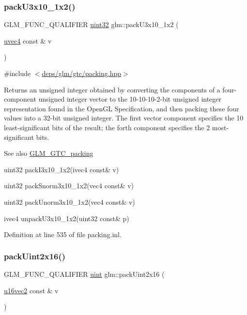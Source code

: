 \subsubsection{\texorpdfstring{pack\+U3x10\+\_\+1x2()}{packU3x10\_1x2()}}
{\footnotesize\ttfamily G\+L\+M\+\_\+\+F\+U\+N\+C\+\_\+\+Q\+U\+A\+L\+I\+F\+I\+ER \hyperlink{group__gtc__type__precision_ga202b6a53c105fcb7e531f9b443518451}{uint32} glm\+::pack\+U3x10\+\_\+1x2 (\begin{DoxyParamCaption}\item[{\hyperlink{group__core__types_ga1c426d19627b32b14f0089f7f4ba7b1d}{uvec4} const \&}]{v }\end{DoxyParamCaption})}



{\ttfamily \#include $<$\hyperlink{gtc_2packing_8hpp}{deps/glm/gtc/packing.\+hpp}$>$}

Returns an unsigned integer obtained by converting the components of a four-\/component unsigned integer vector to the 10-\/10-\/10-\/2-\/bit unsigned integer representation found in the Open\+GL Specification, and then packing these four values into a 32-\/bit unsigned integer. The first vector component specifies the 10 least-\/significant bits of the result; the forth component specifies the 2 most-\/significant bits.

\begin{DoxySeeAlso}{See also}
\hyperlink{group__gtc__packing}{G\+L\+M\+\_\+\+G\+T\+C\+\_\+packing} 

uint32 pack\+I3x10\+\_\+1x2(ivec4 const\& v) 

uint32 pack\+Snorm3x10\+\_\+1x2(vec4 const\& v) 

uint32 pack\+Unorm3x10\+\_\+1x2(vec4 const\& v) 

ivec4 unpack\+U3x10\+\_\+1x2(uint32 const\& p) 
\end{DoxySeeAlso}


Definition at line 535 of file packing.\+inl.

\mbox{\label{group__gtc__packing_gad5ca2e64edae3c233657c9fb0d18a9c9}} 
\subsubsection{\texorpdfstring{pack\+Uint2x16()}{packUint2x16()}}
{\footnotesize\ttfamily G\+L\+M\+\_\+\+F\+U\+N\+C\+\_\+\+Q\+U\+A\+L\+I\+F\+I\+ER \hyperlink{group__core__precision_ga4fd29415871152bfb5abd588334147c8}{uint} glm\+::pack\+Uint2x16 (\begin{DoxyParamCaption}\item[{\hyperlink{group__gtc__type__precision_ga50bd2ceeb100a187e7c46f135269a0ec}{u16vec2} const \&}]{v }\end{DoxyParamCaption})}



